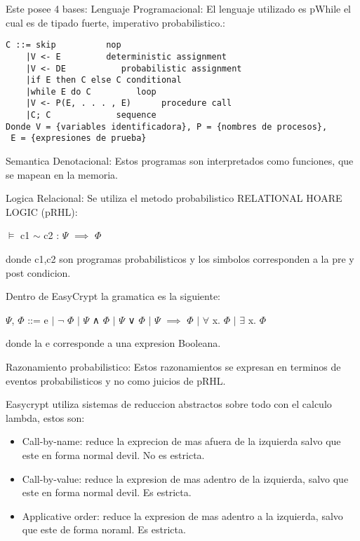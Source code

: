 \documentclass[runningheads,a4paper]{llncs}
\begin{document}
Este posee 4 bases:
Lenguaje Programacional:
El lenguaje utilizado es pWhile el cual es de tipado fuerte, imperativo probabilistico.:

\begin{Verbatim}
C ::= skip		 	nop
	|V <- E		    deterministic assignment
	|V <- DE		   probabilistic assignment
	|if E then C else C	conditional
	|while E do C	      loop
	|V <- P(E, . . . , E)      procedure call
	|C; C		      sequence
Donde V = {variables identificadora}, P = {nombres de procesos},
 E = {expresiones de prueba}
\end{Verbatim}

Semantica Denotacional:
Estos programas son interpretados como funciones, que se mapean en la memoria.

Logica Relacional: Se utiliza el metodo probabilistico RELATIONAL HOARE LOGIC (pRHL):
		
\centerline{$\models$ c1 $\sim$ c2 : $\Psi$ $\implies$ $\Phi$}	
			
donde c1,c2 son programas probabilisticos y los simbolos corresponden a la pre y post condicion.

Dentro de EasyCrypt la gramatica es la siguiente:

\centerline{$\Psi$, $\Phi$ ::= e $\mid$ $\neg$ $\Phi$ $\mid$ $\Psi$ ∧ $\Phi$ $\mid$ $\Psi$ ∨ $\Phi$ $\mid$ $\Psi$ $\implies$ $\Phi$ $\mid$ $\forall$ x. $\Phi$ $\mid$ $\exists$ x. $\Phi$}

donde la e corresponde a una expresion Booleana.


Razonamiento probabilistico:
Estos razonamientos se expresan en terminos de eventos probabilisticos y no como juicios de pRHL.\cite{article5}


Easycrypt utiliza sistemas de reduccion abstractos sobre todo con el calculo lambda, estos son:

\begin{itemize}

	\item Call-by-name: reduce la exprecion de mas afuera de la izquierda salvo que este en forma normal devil. No es estricta.

	\item Call-by-value: reduce la expresion de mas adentro de la izquierda, salvo que este en forma normal devil. Es estricta.

	\item Applicative order: reduce la expresion de mas adentro a la izquierda, salvo que este de forma noraml. Es estricta.
\end{itemize}
\end{document}
